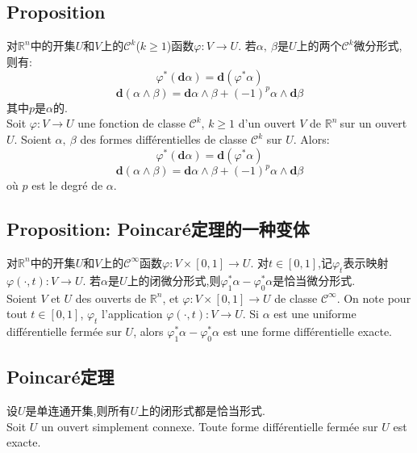 \documentclass[12pt, a4paper, oneside]{ctexbook}
\newcommand{\die }{\textbf{d}}%
\newcommand{\R }{\mathbb{R}}%
\newcommand{\Rn }{$\R^n\ $}%
\newcommand{\fai }{\varphi}%
\newcommand{\C }{\mathcal{C}}%
\begin{document}
  \subsection{Proposition}
  对$\R^n$中的开集$U$和$V$上的$\C^k$($k\geq 1$)$函数\fai:V\to U$.
  若$\alpha,\ \beta$是$U$上的两个$\C^k$微分形式,则有:
  $$
  \fai^*(\die \alpha)=\die(\fai^*\alpha)
  $$
  $$
  \die(\alpha\wedge\beta)=\die \alpha\wedge\beta+(-1)^p \alpha\wedge\die\beta
  $$
  其中$p$是$\alpha$的.\\
  \indent
  Soit $\fai:V\to U$ une fonction de classe $\C^k,\,k\geq 1$ d'un ouvert $V$ de \Rn sur un ouvert $U$.
  Soient $\alpha,\ \beta$ des formes différentielles de classe $\C^k$ sur $U$.
  Alors:
  $$
  \fai^*(\die \alpha)=\die(\fai^*\alpha)
  $$
  $$
  \die(\alpha\wedge\beta)=\die \alpha\wedge\beta+(-1)^p \alpha\wedge\die\beta
  $$
  où $p$ est le degré de $\alpha$.

  \subsection{Proposition: Poincaré定理的一种变体}
  对$\R^n$中的开集$U$和$V$上的$\C^\infty$函数$\fai:V\times [0,1]\to U$.
  对$t\in[0,1]$,记$\fai_t$表示映射$\fai(\cdot,t):V\to U$.
  若$\alpha$是$U$上的闭微分形式,则$\fai^*_1\alpha-\fai^*_0\alpha$是恰当微分形式.\\
  \indent
  Soient $V$ et $U$ des ouverts de $\R^n$, et $\fai:V\times [0,1]\to U$ de classe $\C^\infty$. 
  On note pour tout $t\in[0,1]$, $\fai_t$ l'application $\fai(\cdot,t):V\to U$. 
  Si $\alpha$ est une uniforme différentielle fermée sur $U$, alors  $\fai^*_1\alpha-\fai^*_0\alpha$ est une forme différentielle exacte.

  \subsection{Poincaré定理}
  设$U$是单连通开集,则所有$U$上的闭形式都是恰当形式.\\
  \indent
  Soit $U$ un ouvert simplement connexe. Toute forme différentielle fermée sur $U$ est exacte.
\end{document}
